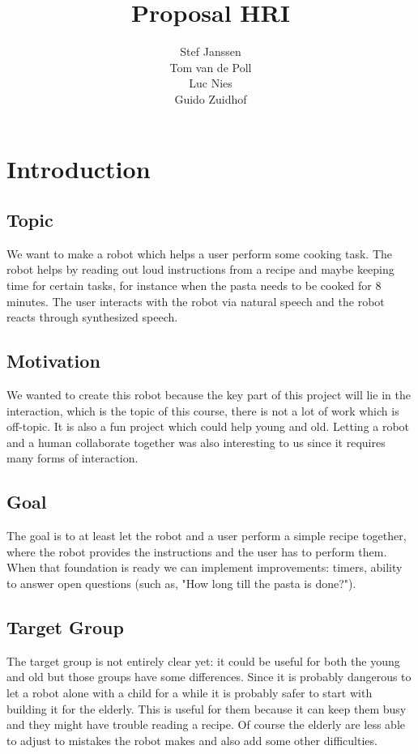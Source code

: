 \documentclass[11pt]{article} %
\title{Proposal HRI }
\author{Stef Janssen\\
	Tom van de Poll\\
	Luc Nies\\
	Guido Zuidhof}
\begin{document}
\maketitle

\section{Introduction}

\subsection{Topic} We want to make a robot which helps a user perform some cooking task. The robot helps by reading out loud instructions from a recipe and maybe keeping time for certain tasks, for instance when the pasta needs to be cooked for 8 minutes. The user interacts with the robot via natural speech and the robot reacts through synthesized speech.

\subsection{Motivation} We wanted to create this robot because the key part of this project will lie in the interaction, which is the topic of this course, there is not a lot of work which is off-topic. It is also a fun project which could help young and old. Letting a robot and a human collaborate together was also interesting to us since it requires many forms of interaction. 

\subsection{Goal} The goal is to at least let the robot and a user perform a simple recipe together, where the robot provides the instructions and the user has to perform them. When that foundation is ready we can implement improvements: timers, ability to answer open questions (such as, "How long till the pasta is done?").

\subsection{Target Group} The target group is not entirely clear yet: it could be useful for both the young and old but those groups have some differences. Since it is probably dangerous to let a robot alone with a child for a while it is probably safer to start with building it for the elderly. This is useful for them because it can keep them busy and they might have trouble reading a recipe. Of course the elderly are less able to adjust to mistakes the robot makes and also add some other difficulties.
\end{document}
